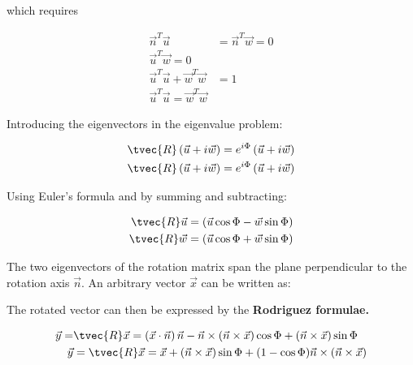\documentclass[10pt,a4paper]{scrartcl}
\begin{document}
\begin{multicols*}{2}
which requires

\begin{align*}
\vec{n}^T\vec{u}&=\vec{n}^T\vec{w}=0\\
\vec{u}^T\vec{w}=0\\
\vec{u}^T\vec{u}+\vec{w}^T\vec{w}&=1\\
\vec{u}^T\vec{u}=\vec{w}^T\vec{w}
\end{align*}

Introducing the eigenvectors in the eigenvalue problem:

\begin{align*}
\tvec{R}\left(\vec{u}+i\vec{w}\right)&=e^{i\Phi}\left(\vec{u}+i\vec{w}\right)\\
\tvec{R}\left(\vec{u}+i\vec{w}\right)&=e^{i\Phi}\left(\vec{u}+i\vec{w}\right)
\end{align*}

Using Euler's formula and by summing and subtracting:

\begin{align*}
\tvec{R}\vec{u}&=\left(\vec{u}\cos\Phi-\vec{w}\sin\Phi\right)\\
\tvec{R}\vec{w}&=\left(\vec{u}\cos\Phi+\vec{w}\sin\Phi\right)
\end{align*}


The two eigenvectors of the rotation matrix span the plane perpendicular to the rotation axis $\vec{n}$. An arbitrary vector $\vec{x}$ can be written as:


The rotated vector can then be expressed by the \textbf{Rodriguez formulae.}

\begin{align*}
\vec{y}=&\tvec{R}\vec{x}=\left(\vec{x}\cdot\vec{n}\right)\vec{n}-\vec{n}\times\left(\vec{n}\times\vec{x}\right)\cos\Phi+\left(\vec{n}\times\vec{x}\right)\sin\Phi\\
\vec{y}&=\tvec{R}\vec{x}=\vec{x}+\left(\vec{n}\times\vec{x}\right)\sin\Phi+(1-\cos\Phi)\vec{n}\times\left(\vec{n}\times\vec{x}\right)
\end{align*}



\end{multicols*}
\end{document}
